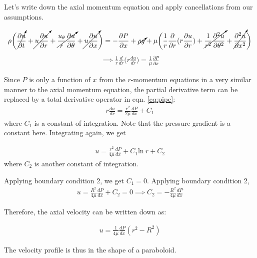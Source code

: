 \documentclass[book.tex]{subfiles}
\begin{document}
Let's write down the axial momentum equation and apply cancellations from our assumptions.

\begin{align}
\rho \bigg( \cancelto{}{\frac{\partial u}{\partial t}} +\cancelto{}{u\frac{\partial u}{\partial r}}+\cancelto{}{\frac{u_{\theta}}{r}\frac{\partial u}{\partial \theta}}+\cancelto{}{u\frac{\partial u}{\partial x}}\bigg)=-\frac{\partial P}{\partial x}+\cancelto{}{\rho g} + \mu\bigg( \frac{1}{r} \frac{\partial}{\partial r} (r\frac{\partial u}{\partial r}) + \cancelto{}{\frac{1}{r^2} \frac{\partial^2 u}{\partial \theta^2}}+ \cancelto{}{\frac{\partial^2 u}{\partial x^2}}\bigg)    
\end{align}
\begin{align}
\implies \frac{1}{r}\frac{d}{dr}\bigg(r\frac{du}{dr}\bigg)=\frac{1}{\mu}\frac{\partial P}{\partial x}    
\label{eq:pipe}
\end{align}

Since $P$ is only a function of $x$ from the $r$-momentum equations in a very similar manner to the axial momentum equation, the partial derivative term can be replaced by a total derivative operator in eqn. \ref{eq:pipe}:
\begin{align}
    r\frac{du}{dr}=\frac{r^2}{2\mu}\frac{dP}{dx}+C_1
\end{align}
where $C_1$ is a constant of integration. Note that the pressure gradient is a constant here. Integrating again, we get

\begin{align}
u=\frac{r^2}{4\mu}\frac{dP}{dx}+C_1 \mathrm{ln}\ r+C_2
\end{align}
where $C_2$ is another constant of integration.
    
Applying boundary condition 2, we get $C_1=0$. Applying boundary condition 2,
\begin{align}
    u=\frac{R^2}{4\mu}\frac{dP}{dx}+C_2=0 \implies C_2=-\frac{R^2}{4\mu}\frac{dP}{dx}
\end{align}

Therefore, the axial velocity can be written down as:

\begin{align}
    u=\frac{1}{4\mu}\frac{dP}{dx}(r^2-R^2)
\end{align}

The velocity profile is thus in the shape of a paraboloid.
\end{document}
